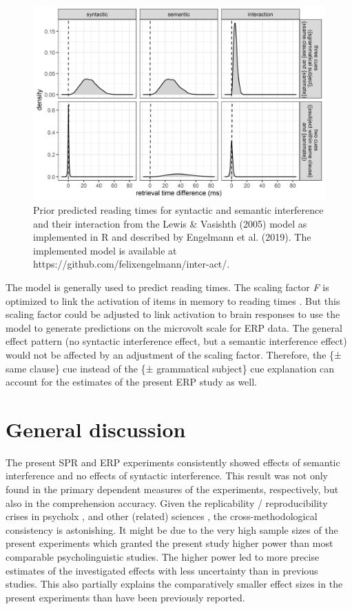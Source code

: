 \documentclass[a4paper, man, floatsintext]{apa7}
\begin{document}
\begin{figure}[H]
    \centering
    \caption{Prior predicted reading times for syntactic and semantic interference and their interaction from the Lewis \& Vasishth (2005) model as implemented in R and described by Engelmann et al. (2019). The implemented model is available at https://github.com/felixengelmann/inter-act/.}
    \label{fig:model_predictions}\includegraphics[width=\textwidth]{images/PriorPredicted_interACTversions.png}
\end{figure}

The \citet{Lewis2005} model is generally used to predict reading times. The scaling factor \textit{F} is optimized to link the activation of items in memory to reading times \citep{Lewis2005}. But this scaling factor could be adjusted to link activation to brain responses to use the model to generate predictions on the microvolt scale for ERP data. The general effect pattern (no syntactic interference effect, but a semantic interference effect) would not be affected by an adjustment of the scaling factor. Therefore, the \{± same clause\} cue instead of the \{± grammatical subject\} cue explanation can account for the estimates of the present ERP study as well.


\section{General discussion}
The present SPR and ERP experiments consistently showed effects of semantic interference and no effects of syntactic interference. This result was not only found in the primary dependent measures of the experiments, respectively, but also in the comprehension accuracy. Given the replicability / reproducibility crises in psycholx \citep[see e.g., ][]{vasishth2018_signficancefilter}, and other (related) sciences \citep[see e.g., ][]{openscience2015_reproducibility}, the cross-methodological consistency is astonishing. It might be due to the very high sample sizes of the present experiments which granted the present study higher power than most comparable psycholinguistic studies. The higher power led to more precise estimates of the investigated effects with less uncertainty than in previous studies. This also partially explains the comparatively smaller effect sizes in the present experiments than have been previously reported.
\end{document}
